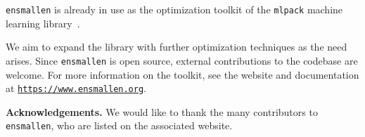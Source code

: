 \documentclass{article}
\begin{document}
\texttt{\small ensmallen} is already in use as the optimization toolkit of the
\texttt{\small mlpack} machine learning library~\cite{mlpack2018}.

We aim to expand the library with further optimization techniques
as the need arises.  Since {\tt ensmallen} is open source,
external contributions to the codebase are welcome.
For more information on the
toolkit, see the website and documentation at
\href{https://www.ensmallen.org}{\tt\small https://www.ensmallen.org}.


{\bf Acknowledgements.}
We would like to thank the many contributors to {\tt ensmallen},
who are listed on the associated website.

% 





\end{document}
